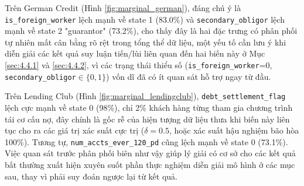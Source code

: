 Trên German Credit (Hình \ref{fig:marginal_german}), đáng chú ý là \texttt{is\_foreign\_worker} lệch mạnh về state 1 (83.0\%) và \texttt{secondary\_obligor} lệch mạnh về state 2 "guarantor" (73.2\%), cho thấy đây là hai đặc trưng có phân phối tự nhiên mất cân bằng rõ rệt trong tổng thể dữ liệu, một yếu tố cần lưu ý khi diễn giải các kết quả suy luận tiến/lùi liên quan đến hai biến này ở Mục \ref{sec:4.4.1} và \ref{sec:4.4.2}, vì các trạng thái thiểu số (\texttt{is\_foreign\_worker}=0, \texttt{secondary\_obligor}$\in\{0,1\}$) vốn dĩ đã có ít quan sát hỗ trợ ngay từ đầu.

Trên Lending Club (Hình \ref{fig:marginal_lendingclub}), \texttt{debt\_settlement\_flag} lệch cực mạnh về state 0 (98\%), chỉ 2\% khách hàng từng tham gia chương trình tái cơ cấu nợ, đây chính là gốc rễ của hiện tượng dữ liệu thưa khi biến này liên tục cho ra các giá trị xác suất cực trị ($\delta=0.5$, hoặc xác suất hậu nghiệm bão hòa 100\%). Tương tự, \texttt{num\_accts\_ever\_120\_pd} cũng lệch mạnh về state 0 (73.1\%). Việc quan sát trước phân phối biên như vậy giúp lý giải có cơ sở cho các kết quả bất thường xuất hiện xuyên suốt phần thực nghiệm diễn giải mô hình ở các mục sau, thay vì phải suy đoán ngược lại từ kết quả.

